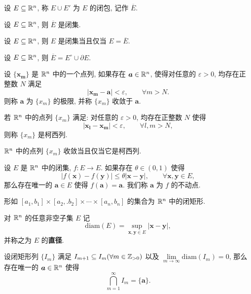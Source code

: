 \begin{definition}[闭包]
	设 $E \subseteq \mathbb {R}^{n}$, 称 $E \cup E'$ 为 $E$ 的闭包, 记作 $\overline{E}$.
\end{definition}

\begin{proposition}
	设 $E \subseteq \mathbb {R}^{n}$, 则 $\overline{E}$ 是闭集.
\end{proposition}

\begin{proposition}
	设 $E \subseteq \mathbb {R}^{n}$, 则 $E$ 是闭集当且仅当 $E= \overline{E}$.
\end{proposition}

\begin{proposition}
	设 $E \subseteq \mathbb {R}^{n}$, 则 $\overline{E}=E^\circ \cup \partial E$.
\end{proposition}

\begin{definition}[极限、收敛]
	设 $\{\bm {x_m}\}$ 是 $\mathbb {R}^{n}$ 中的一个点列, 如果存在 $\bm a \in \mathbb {R}^{n}$, 使得对任意的 $\varepsilon>0$, 均存在正整数 $N$ 满足
	$$|\bm{x_m} - \bm a|<\varepsilon,\qquad \forall m>N.$$
	则称 $\bm a$ 为 $\{x_m\}$ 的极限, 并称 $\{x_m\}$ 收敛于 $\bm a$.
\end{definition}

\begin{definition}[柯西列]
	若 $\mathbb {R}^{n}$ 中的点列 $\{x_m\}$ 满足: 对任意的 $\varepsilon>0$, 均存在正整数 $N$ 使得
	$$|\bm{x_l}-\bm{x_m}|<\varepsilon, \qquad \forall l,m>N,$$
	则称 $\{x_m\}$ 是柯西列.
\end{definition}

\begin{theorem}[柯西收敛准则]
	$\mathbb {R}^{n}$ 中的点列 $\{x_m\}$ 收敛当且仅当它是柯西列.
\end{theorem}

\begin{theorem}[压缩映像原理]
	设 $E$ 是 $\mathbb {R}^{n}$ 中的闭集, $f:E \to E$. 如果存在 $\theta \in (0,1)$ 使得
	$$|f(\bm x)-f(\bm y)|\le \theta|\bm x- \bm y|,\qquad \forall \bm x,\bm y \in E,$$
	那么存在唯一的 $\bm a \in E$ 使得 $f(\bm a)=\bm a$. 我们称 $\bm a$ 为 $f$ 的不动点.
\end{theorem}

\begin{definition}[闭矩形]
	形如 $[a_1,b_1]\times[a_2,.b_2]\times \cdots \times [a_n,b_n]$ 的集合为 $\mathbb {R}^{n}$ 中的闭矩形.
\end{definition}

\begin{definition}[直径]
	对 $\mathbb {R}^{n}$ 的任意非空子集 $E$ 记
	$$\text{diam}(E)=\sup\limits_{\bm x,\bm y \in E}|\bm x-\bm y|,$$
	并称之为 $E$ 的\textbf{直径}.
\end{definition}
\begin{theorem}[闭矩形套定理]\label{多元闭矩形套定理}
	设闭矩形列 $\{I_m\}$ 满足 $I_{m+1}\subseteq I_m(\forall m \in \mathbb {Z}_{>0})$ 以及 $\lim\limits_{m\to \infty} \text{diam}(I_m)=0$, 那么存在唯一的 $\bm a \in \mathbb {R}^{n}$ 使得
	$$\bigcap\limits_{m=1}^\infty I_m=\{\bm a\}.$$
\end{theorem}

